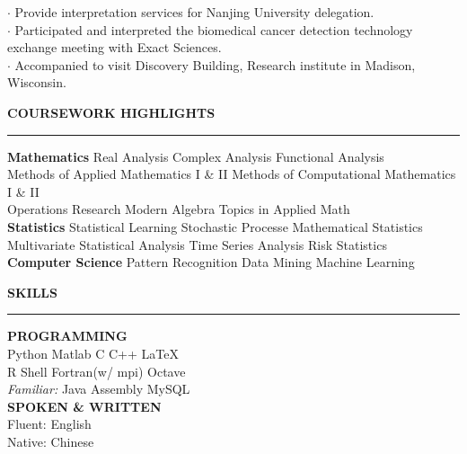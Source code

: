 \documentclass[11pt,A4]{article}
\newcommand{\cvsection}[1]
{
	\begin{center}
		\large\textcolor{sectcol}{\textbf{#1}}
	\end{center}
}
\begin{document}
        $\cdot$ Provide interpretation services for Nanjing University delegation.\\
        $\cdot$ Participated and interpreted the biomedical cancer detection 
                technology exchange meeting with Exact Sciences.\\
        $\cdot$ Accompanied to visit Discovery Building, Research institute in Madison, Wisconsin.\\


\newpage


\cvsection{COURSEWORK HIGHLIGHTS}
\vspace{-18pt}
\textcolor{softcol}{\hrule}
\vspace{6pt}

\textbf{Mathematics}
Real Analysis \textbullet{} Complex Analysis \textbullet{} Functional Analysis \\
Methods of Applied Mathematics I \& II \textbullet{} Methods of Computational Mathematics I \& II \\
Operations Research \textbullet{} Modern Algebra \textbullet{} Topics in Applied Math\\

\textbf{Statistics}
Statistical Learning \textbullet{} Stochastic Processe \textbullet{} Mathematical Statistics \\
Multivariate Statistical Analysis \textbullet{} Time Series Analysis \textbullet{} Risk Statistics\\

\textbf{Computer Science}
Pattern Recognition \textbullet{} Data Mining \textbullet{} Machine Learning\\


\cvsection{SKILLS}
\vspace{-18pt}
\textcolor{softcol}{\hrule}
\vspace{6pt}

\textbf{PROGRAMMING}\\
Python \textbullet{} Matlab \textbullet{} C \textbullet{} C++ \textbullet{} \LaTeX\ \\
R \textbullet{} Shell \textbullet{} Fortran(w/ mpi) \textbullet{} Octave\\
\textit{Familiar:}
Java \textbullet{} Assembly \textbullet{} MySQL\\

\textbf{SPOKEN \& WRITTEN}\\
Fluent: English \\
Native: Chinese\\
\end{document}
